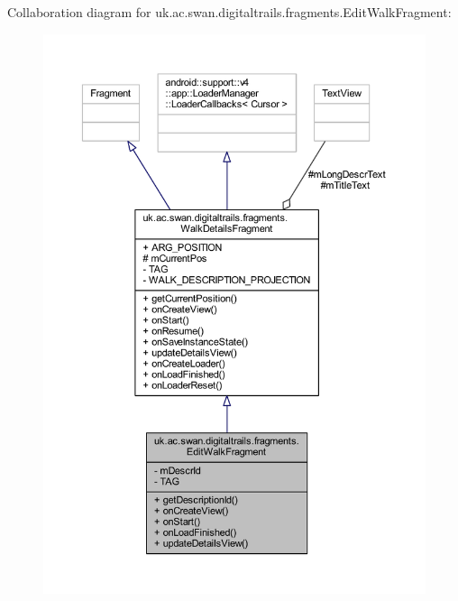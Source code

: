 Collaboration diagram for uk.\+ac.\+swan.\+digitaltrails.\+fragments.\+Edit\+Walk\+Fragment\+:
\nopagebreak
\begin{figure}[H]
\begin{center}
\leavevmode
\includegraphics[width=350pt]{classuk_1_1ac_1_1swan_1_1digitaltrails_1_1fragments_1_1_edit_walk_fragment__coll__graph}
\end{center}
\end{figure}
